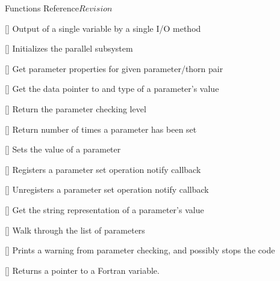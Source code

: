 \begin{cactuspart}{ Functions Reference}{}{$Revision$}
\begin{Lentry}
\item[\code{CCTK\_OutputVarByMethod}] [\pageref{CCTK-OutputVarByMethod}]
  Output of a single variable by a single I/O method

\item[\code{CCTK\_ParallelInit}] [\pageref{CCTK-ParallelInit}]
  Initializes the parallel subsystem

\item[\code{CCTK\_ParameterData}]
  [\pageref{CCTK-ParameterData}]
  Get parameter properties for given parameter/thorn pair

\item[\code{CCTK\_ParameterGet}]
  [\pageref{CCTK-ParameterGet}]
  Get the data pointer to and type of a parameter's value

\item[\code{CCTK\_ParameterLevel}]
  [\pageref{CCTK-ParameterLevel}]
  Return the parameter checking level

\item[\code{CCTK\_ParameterQueryTimesSet}]
  [\pageref{CCTK-ParameterQueryTimesSet}]
  Return number of times a parameter has been set

\item[\code{CCTK\_ParameterSet}]
  [\pageref{CCTK-ParameterSet}]
  Sets the value of a parameter

\item[\code{CCTK\_ParameterSetNotifyRegister}]
  [\pageref{CCTK-ParameterSetNotifyRegister}]
  Registers a parameter set operation notify callback

\item[\code{CCTK\_ParameterSetNotifyUnregister}]
  [\pageref{CCTK-ParameterSetNotifyUnregister}]
  Unregisters a parameter set operation notify callback

\item[\code{CCTK\_ParameterValString}]
  [\pageref{CCTK-ParameterValString}]
  Get the string representation of a parameter's value

\item[\code{CCTK\_ParameterWalk}]
  [\pageref{CCTK-ParameterWalk}]
  Walk through the list of parameters

\item[\code{CCTK\_PARAMWARN}] [\pageref{CCTK-PARAMWARN}]
  Prints a warning from parameter checking, and possibly stops the code

\item[\code{CCTK\_PointerTo}] [\pageref{CCTK-PointerTo}]
  Returns a pointer to a Fortran variable.


\end{Lentry}
\end{cactuspart}
